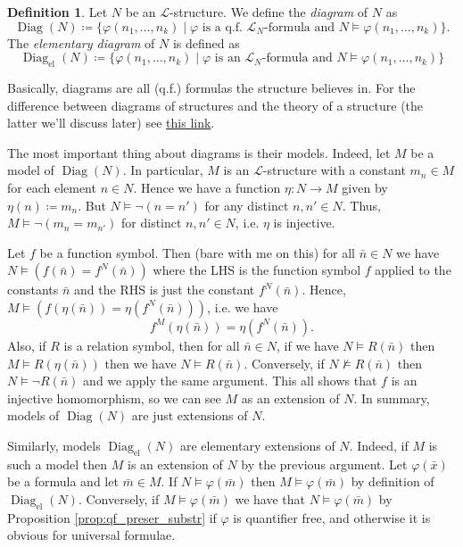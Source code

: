 \documentclass{report}
\DeclareMathOperator{\Diag}{Diag}
\theoremstyle{definition}
\theoremstyle{plain}
\theoremstyle{definition}
\newtheorem{defn}[thm]{Definition}
\begin{document}
 		\begin{defn}
 			Let $N$ be an $\mathcal{L}$-structure. We define the \emph{diagram} of $N$ as 
 			\[
 				\Diag(N) \coloneqq \{\varphi(n_1,\ldots,n_k) \mid \varphi \text{ is a q.f. $\mathcal{L}_{N}$-formula and }N \models \varphi(n_1,\ldots,n_k)\}.
 			\]
 			The \emph{elementary diagram} of $N$ is defined as 
 			\[
 				\Diag_{\text{el}}(N) \coloneqq \{\varphi(n_1,\ldots,n_k) \mid \varphi \text{ is an $\mathcal{L}_{N}$-formula and }N \models \varphi(n_1,\ldots,n_k)\}
 			\]
 		\end{defn}
 		Basically, diagrams are all (q.f.) formulas the structure believes in. For the difference between diagrams of structures and the theory of a structure (the latter we'll discuss later) see \href{https://math.stackexchange.com/a/3644376}{this link}.
 		
 		The most important thing about diagrams is their models. Indeed, let $M$ be a model of $\Diag(N)$. In particular, $M$ is an $\mathcal{L}$-structure with a constant $m_n\in M$ for each element $n\in N$. Hence we have a function $\eta \colon N \to M$ given by $\eta(n) \coloneqq m_n$. But $N\models \neg(n = n')$ for any distinct $n,n'\in N$. Thus, $M\models \neg(m_n = m_{n'})$ for distinct $n,n'\in N$, i.e. $\eta$ is injective. 
 		
 		Let $f$ be a function symbol. Then (bare with me on this) for all $\bar{n}\in N$ we have $N \models (f(\bar{n}) = f^{N}(\bar{n}))$ where the LHS is the function symbol $f$ applied to the constants $\bar{n}$ and the RHS is just the constant $f^{N}(\bar{n})$. Hence, $M\models (f(\eta(\bar{n})) = \eta(f^{N}(\bar{n})))$, i.e. we have
 		\[
 			f^M(\eta(\bar{n})) = \eta(f^N(\bar{n})).
 		\]
 		Also, if $R$ is a relation symbol, then for all $\bar{n}\in N$, if we have  $N \models R(\bar{n})$ then $M \models R(\eta(\bar{n}))$ then we have $N \models R(\bar{n})$. Conversely, if $N \nvDash R(\bar{n})$ then $N\models \neg R(\bar{n})$ and we apply the same argument. This all shows that $f$ is an injective homomorphism, so we can see $M$ as an extension of $N$. In summary, models of $\Diag(N)$ are just extensions of $N$.
 		
 		Similarly, models $\Diag_{\text{el}}(N)$ are elementary extensions of $N$. Indeed, if $M$ is such a model then $M$ is an extension of $N$ by the previous argument. Let $\varphi(\bar{x})$ be a formula and  let $\bar{m}\in M$. If $N \models \varphi(\bar{m})$ then $M \models \varphi(\bar{m})$ by definition of $\Diag_{\text{el}}(N)$. Conversely, if $M \models \varphi(\bar{m})$ we have that $N \models \varphi(\bar{m})$ by Proposition \ref{prop:qf_preser_substr} if $\varphi$ is quantifier free, and otherwise it is obvious for universal formulae.
 		
\end{document}
